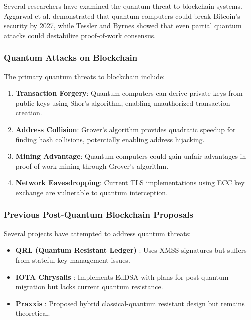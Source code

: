 \documentclass[12pt,a4paper]{article}
\begin{document}
Several researchers have examined the quantum threat to blockchain systems. Aggarwal et al. \cite{aggarwal2018} demonstrated that quantum computers could break Bitcoin's security by 2027, while Tessler and Byrnes \cite{tessler2018} showed that even partial quantum attacks could destabilize proof-of-work consensus.

\subsubsection{Quantum Attacks on Blockchain}

The primary quantum threats to blockchain include:

\begin{enumerate}
\item \textbf{Transaction Forgery}: Quantum computers can derive private keys from public keys using Shor's algorithm, enabling unauthorized transaction creation.
\item \textbf{Address Collision}: Grover's algorithm provides quadratic speedup for finding hash collisions, potentially enabling address hijacking.
\item \textbf{Mining Advantage}: Quantum computers could gain unfair advantages in proof-of-work mining through Grover's algorithm.
\item \textbf{Network Eavesdropping}: Current TLS implementations using ECC key exchange are vulnerable to quantum interception.
\end{enumerate}

\subsubsection{Previous Post-Quantum Blockchain Proposals}

Several projects have attempted to address quantum threats:

\begin{itemize}
\item \textbf{QRL (Quantum Resistant Ledger)} \cite{qrl2018}: Uses XMSS signatures but suffers from stateful key management issues.
\item \textbf{IOTA Chrysalis} \cite{iota2021}: Implements EdDSA with plans for post-quantum migration but lacks current quantum resistance.
\item \textbf{Praxxis} \cite{praxxis2019}: Proposed hybrid classical-quantum resistant design but remains theoretical.
\end{itemize}
\end{document}
